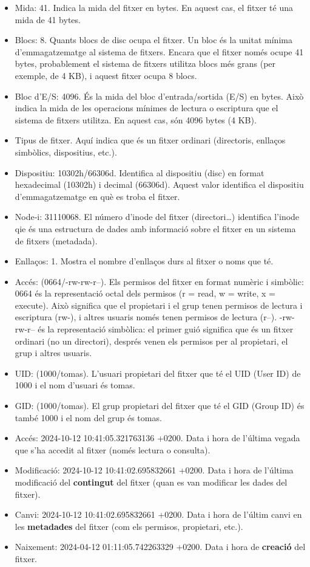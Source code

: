 \documentclass[
  12 pt,
  a4paper,
]{article}
\begin{document}
\begin{itemize}
\item
  Mida: 41. Indica la mida del fitxer en bytes. En aquest cas, el fitxer
  té una mida de 41 bytes.
\item
  Blocs: 8. Quants blocs de disc ocupa el fitxer. Un bloc és la unitat
  mínima d'emmagatzematge al sistema de fitxers. Encara que el fitxer
  només ocupe 41 bytes, probablement el sistema de fitxers utilitza
  blocs més grans (per exemple, de 4 KB), i aquest fitxer ocupa 8 blocs.
\item
  Bloc d'E/S: 4096. És la mida del bloc d'entrada/sortida (E/S) en
  bytes. Això indica la mida de les operacions mínimes de lectura o
  escriptura que el sistema de fitxers utilitza. En aquest cas, són 4096
  bytes (4 KB).
\item
  Tipus de fitxer. Aquí indica que és un fitxer ordinari (directoris,
  enllaços simbòlics, dispositius, etc.).
\item
  Dispositiu: 10302h/66306d. Identifica al dispositiu (disc) en format
  hexadecimal (10302h) i decimal (66306d). Aquest valor identifica el
  dispositiu d'emmagatzematge en què es troba el fitxer.
\item
  Node‐i: 31110068. El número d'inode del fitxer (directori\ldots)
  identifica l'inode qie és una estructura de dades amb informació sobre
  el fitxer en un sistema de fitxers (metadada).
\item
  Enllaços: 1. Mostra el nombre d'enllaços durs al fitxer o noms que té.
\item
  Accés: (0664/-rw-rw-r--). Els permisos del fitxer en format numèric i
  simbòlic: 0664 és la representació octal dels permisos (r = read, w =
  write, x = execute). Això significa que el propietari i el grup tenen
  permisos de lectura i escriptura (rw-), i altres usuaris només tenen
  permisos de lectura (r--). -rw-rw-r-- és la representació simbòlica:
  el primer guió significa que és un fitxer ordinari (no un directori),
  després venen els permisos per al propietari, el grup i altres
  usuaris.
\item
  UID: (1000/tomas). L'usuari propietari del fitxer que té el UID (User
  ID) de 1000 i el nom d'usuari és tomas.
\item
  GID: (1000/tomas). El grup propietari del fitxer que té el GID (Group
  ID) és també 1000 i el nom del grup és tomas.
\item
  Accés: 2024-10-12 10:41:05.321763136 +0200. Data i hora de l'última
  vegada que s'ha accedit al fitxer (només lectura o consulta).
\item
  Modificació: 2024-10-12 10:41:02.695832661 +0200. Data i hora de
  l'última modificació del \textbf{contingut} del fitxer (quan es van
  modificar les dades del fitxer).
\item
  Canvi: 2024-10-12 10:41:02.695832661 +0200. Data i hora de l'últim
  canvi en les \textbf{metadades} del fitxer (com els permisos,
  propietari, etc.).
\item
  Naixement: 2024-04-12 01:11:05.742263329 +0200. Data i hora de
  \textbf{creació} del fitxer.
\end{itemize}
\end{document}
